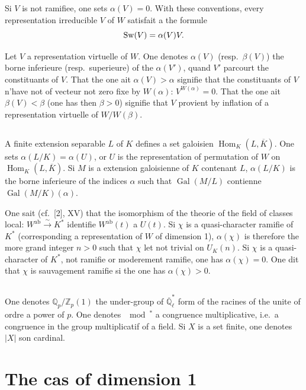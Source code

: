 \documentclass[12pt,a4paper]{article}
\theoremstyle{plain}
\theoremstyle{definition}
\theoremstyle{remark}
\DeclareMathOperator{\Hom}{Hom}
\DeclareMathOperator{\sw}{Sw}
\newcommand{\bQ}{\mathbb{Q}}
\newcommand{\bZ}{\mathbb{Z}}
\let\dim\relax\let\det\relax
\providecommand{\Hom}{\operatorname{Hom}}
\providecommand{\Gal}{\operatorname{Gal}}
\begin{document}
Si $V$ is not ramifiee, one sets $\alpha(V) = 0$. With these conventions, every representation irreducible $V$ of $W$ satisfait a the formule
\[
\sw(V) = \alpha(V) \dim V.
\]

Let $V$ a representation virtuelle of $W$. One denotes $\alpha(V)$ (resp.~$\beta(V)$) the borne inferieure (resp.~superieure) of the $\alpha(V')$, quand $V'$ parcourt the constituants of $V$. That the one ait $\alpha(V) > \alpha$ signifie that the constituants of $V$ n'have not of vecteur not zero fixe by $W(\alpha)$: $V^{W(\alpha)} = 0$. That the one ait $\beta(V) < \beta$ (one has then $\beta > 0$) signifie that $V$ provient by inflation of a representation virtuelle of $W/W(\beta)$.

\subsection{}
\label{sec:0.7}

A finite extension separable $L$ of $K$ defines a set galoisien $\Hom_K(L, \overline{K})$. One sets $\alpha(L/K) = \alpha(U)$, or $U$ is the representation of permutation of $W$ on $\Hom_K(L, \overline{K})$. Si $M$ is a extension galoisienne of $K$ contenant $L$, $\alpha(L/K)$ is the borne inferieure of the indices $\alpha$ such that $\Gal(M/L)$ contienne $\Gal(M/K)(\alpha)$.

One sait (cf.~[2], XV) that the isomorphism of the theorie of the field of classes local: $W^{\text{ab}} \xrightarrow{\sim} K^*$ identifie $W^{\text{ab}}(t)$ a $U(t)$. Si $\chi$ is a quasi-character ramifie of $K^*$ (corresponding a representation of $W$ of dimension 1), $\alpha(\chi)$ is therefore the more grand integer $n > 0$ such that $\chi$ let not trivial on $U_K(n)$. Si $\chi$ is a quasi-character of $K^*$, not ramifie or moderement ramifie, one has $\alpha(\chi) = 0$. One dit that $\chi$ is sauvagement ramifie si the one has $\alpha(\chi) > 0$.

\subsection{}
\label{sec:0.8}

One denotes $\bQ_p/\bZ_p(1)$ the under-group of $\overline{\bQ}_\ell^*$ form of the racines of the unite of ordre a power of $p$. One denotes $\mod^*$ a congruence multiplicative, i.e.~a congruence in the group multiplicatif of a field. Si $X$ is a set finite, one denotes $|X|$ son cardinal.


\section{The cas of dimension 1}
\label{sec:1}
\setcounter{equation}{0}
\end{document}
